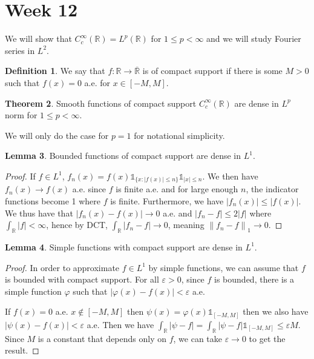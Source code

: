 \documentclass{article}
\newcommand{\R}{\mathbb{R}}
\newcommand{\cl}[1]{\overline{#1}}
\newcommand{\norm}[1]{\left\|#1\right\|}
\theoremstyle{definition} %
\newtheorem{thm}{Theorem}
\numberwithin{thm}{section} %
\newtheorem{lemma}[thm]{Lemma}
\theoremstyle{definition} %
\newtheorem{defn}[thm]{Definition}
\begin{document}
\section{Week 12}

We will show that $C_c^\infty(\R) = L^p(\R)$ for $1 \leq p < \infty$ and we will study Fourier series in $L^2$.

\begin{defn}
We say that $f: \R \to \cl{\R}$ is of compact support if there is some $M > 0$ such that $f(x) = 0$ a.e. for $x \in [-M, M]$.
\end{defn}

\begin{thm}
Smooth functions of compact support $C_c^\infty(\R)$ are dense in $L^p$ norm for $1 \leq p < \infty$.
\end{thm}

We will only do the case for $p = 1$ for notational simplicity.

\begin{lemma}
Bounded functions of compact support are dense in $L^1$.
\end{lemma}
\begin{proof}
If $f \in L^1$, $f_n(x) = f(x)\mathds{1}_{\{x: |f(x)| \leq n\}}\mathds{1}_{|x| \leq n}$. We then have $f_n(x) \to f(x)$ a.e. since $f$ is finite a.e. and for large enough $n$, the indicator functions become 1 where $f$ is finite. Furthermore, we have $|f_n(x)| \leq |f(x)|$. We thus have that $|f_n(x) - f(x)| \to 0$ a.e. and $|f_n - f| \leq 2|f|$ where $\int_\R |f| < \infty$, hence by DCT, $\int_\R |f_n - f| \to 0$, meaning $\norm{f_n - f}_1 \to 0$.
\end{proof}

\begin{lemma}
Simple functions with compact support are dense in $L^1$.
\end{lemma}
\begin{proof}
In order to approximate $f \in L^1$ by simple functions, we can assume that $f$ is bounded with compact support. For all $\varepsilon > 0$, since $f$ is bounded, there is a simple function $\varphi$ such that $|\varphi(x) - f(x)| < \varepsilon$ a.e.

If $f(x) = 0$ a.e. $x \notin [-M, M]$ then $\psi(x) = \varphi(x)\mathds{1}_{[-M, M]}$ then we also have $|\psi(x) - f(x)| < \varepsilon$ a.e. Then we have $\int_\R |\psi - f| = \int_\R |\psi - f|\mathds{1}_{[-M, M]} \leq \varepsilon M$. Since $M$ is a constant that depends only on $f$, we can take $\varepsilon \to 0$ to get the result.
\end{proof}
\end{document}
